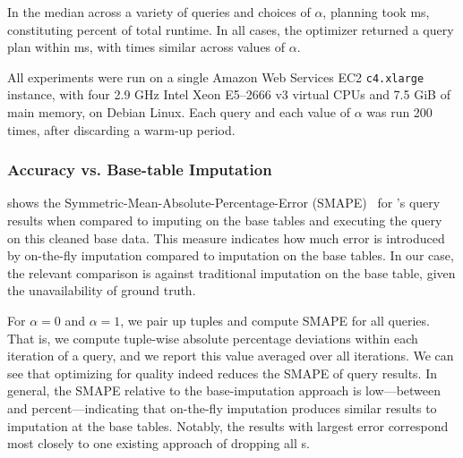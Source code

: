 
In the median across a variety of queries and choices of $\alpha$, planning took
\planningmediantime{} ms, 
constituting \planningruntimepercent{} percent of total runtime. In all cases, the optimizer
returned a query plan within \planningmaxtime{} ms, with times similar across values of $\alpha$.

All experiments were run on a single Amazon Web Services EC2 {\tt c4.xlarge} instance, with
four 2.9 GHz Intel Xeon E5--2666 v3 virtual CPUs and 7.5 GiB of main memory, on Debian Linux.
Each query and each value of $\alpha$ was run 200 times, after discarding a warm-up period.


\subsubsection{Accuracy vs. Base-table Imputation}

 shows the Symmetric-Mean-Absolute-Percentage-Error
(SMAPE)~\cite{Makridakis2000451} for \ProjectName{}'s query results when compared to
imputing on the base tables and executing the query on this cleaned base data.
This measure indicates how much error is introduced by on-the-fly imputation compared to
imputation on the base tables. In our case, the relevant comparison is against traditional
imputation on the base table, given the unavailability of ground truth.

For $\alpha=0$ and $\alpha=1$, we pair up tuples and compute SMAPE for all queries. That is,
we compute tuple-wise absolute percentage deviations within each iteration of a query, and
we report this value averaged over all iterations.  We
can see that optimizing for quality indeed reduces the SMAPE of query results.  In general, the SMAPE relative 
to the base-imputation approach is low---between \lowsmapealphazero{} and
\highsmapealphaoneexacs{} percent---indicating that on-the-fly imputation produces similar
results to imputation at the base tables. Notably, the results with largest error correspond
most closely to one existing approach of dropping all \nullv{}s.

